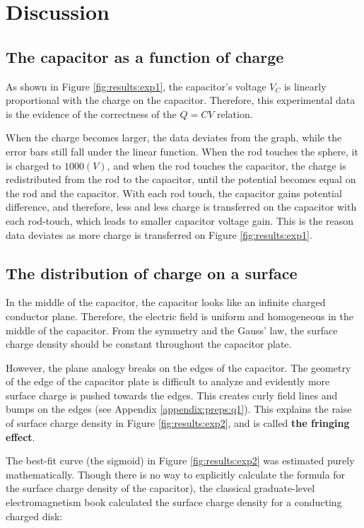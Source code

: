 \section{Discussion}
\subsection{The capacitor as a function of charge}

As shown in Figure \ref{fig:results:exp1}, the capacitor's voltage $V_C$ is linearly proportional with the charge on the capacitor. Therefore, this experimental data is the evidence of the correctness of the $Q = CV$ relation. 

When the charge becomes larger, the data deviates from the graph, while the error bars still fall under the linear function. When the rod touches the sphere, it is charged to $1000 (V)$, and when the rod touches the capacitor, the charge is redistributed from the rod to the capacitor, until the potential becomes equal on the rod and the capacitor. With each rod touch, the capacitor gains potential difference, and therefore, less and less charge is transferred on the capacitor with each rod-touch, which leads to smaller capacitor voltage gain. This is the reason data deviates as more charge is transferred on Figure \ref{fig:results:exp1}. 

\subsection{The distribution of charge on a surface} \label{dis:exp2}
In the middle of the capacitor, the capacitor looks like an infinite charged conductor plane. Therefore, the electric field is uniform and homogeneous in the middle of the capacitor. From the symmetry and the Gauss' law, the surface charge density should be constant throughout the capacitor plate.

However, the plane analogy breaks on the edges of the capacitor. The geometry of the edge of the capacitor plate is difficult to analyze and evidently more surface charge is pushed towards the edges. This creates curly field lines and bumps on the edges (see Appendix \ref{appendix:preps:q1}). This explains the raise of surface charge density in Figure \ref{fig:results:exp2}, and is called \textbf{the fringing effect}.

The best-fit curve (the sigmoid) in Figure \ref{fig:results:exp2} was estimated purely mathematically. Though there is no way to explicitly calculate the formula for the surface charge density of the capacitor), the classical graduate-level electromagnetism book \cite[p.89]{jackson} calculated the surface charge density for a conducting charged disk:

